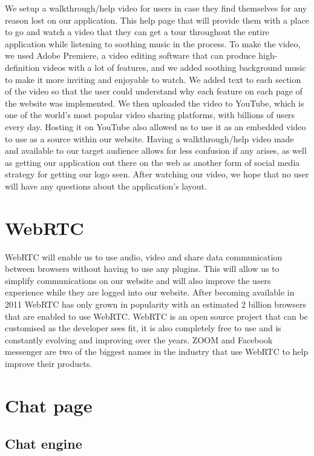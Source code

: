 We setup a walkthrough/help video for users in case they find themselves for any reason lost on our application. This help page that will provide them with a place to go and watch a video that they can get a tour throughout the entire application while listening to soothing music in the process.
To make the video, we used Adobe Premiere, a video editing software that can produce high-definition videos with a lot of features, and we added soothing background music to make it more inviting and enjoyable to watch. We added text to each section of the video so that the user could understand why each feature on each page of the website was implemented.
We then uploaded the video to YouTube, which is one of the world's most popular video sharing platforms, with billions of users every day. Hosting it on YouTube\cite{ref23} also allowed us to use it as an embedded video to use as a source within our website.
Having a walkthrough/help video made and available to our target audience allows for less confusion if any arises, as well as getting our application out there on the web as another form of social media strategy for getting our logo seen.
After watching our video, we hope that no user will have any questions about the application's layout.

\section{WebRTC}

WebRTC\cite{ref16} will enable us to use audio, video and share data communication between browsers without having to use any plugins. This will allow us to simplify communications on our website and will also improve the users experience while they are logged into our website. After becoming available in 2011 WebRTC has only grown in popularity with an estimated 2 billion browsers that are enabled to use WebRTC. WebRTC is an open source project that can be customised as the developer sees fit, it is also completely free to use and is constantly evolving and improving over the years.   
ZOOM and Facebook messenger are two of the biggest names in the industry that use WebRTC to help improve their products. 

\section{Chat page}
\subsection{Chat engine}


